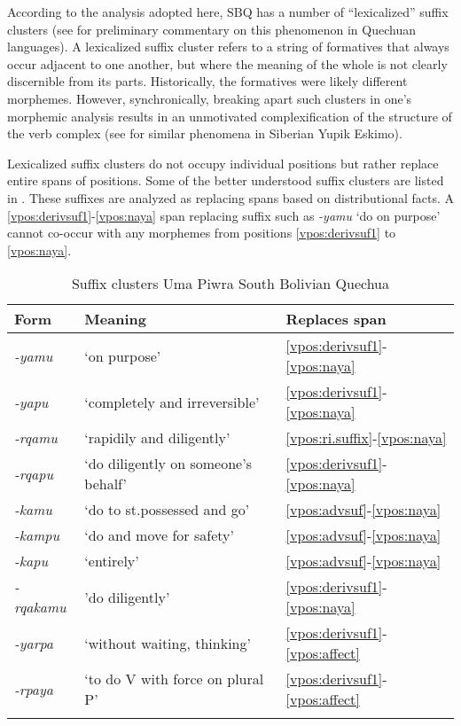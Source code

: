 \documentclass[output=paper]{langscibook}
\begin{document}
According to the analysis adopted here, SBQ has a number of ``lexicalized'' suffix clusters (see \citealt[208--209]{adelaar2004} for preliminary commentary on this phenomenon in Quechuan languages). A lexicalized suffix cluster refers to a string of formatives that always occur adjacent to one another, but where the meaning of the whole is not clearly discernible from its parts. Historically, the formatives were likely different morphemes. However, synchronically, breaking apart such clusters in one's morphemic analysis results in an unmotivated complexification of the structure of the verb complex (see \citealt{Reuse1994} for similar phenomena in Siberian Yupik Eskimo).

Lexicalized suffix clusters do not occupy individual positions but rather replace entire spans of positions. Some of the better understood suffix clusters are listed in . These suffixes are analyzed as replacing spans based on distributional facts. A \ref{vpos:derivsuf1}-\ref{vpos:naya} span replacing suffix such as \textit{-yamu} `do on purpose' cannot co-occur with any morphemes from positions \ref{vpos:derivsuf1} to \ref{vpos:naya}.

\begin{table}[htp]
\caption{Suffix clusters Uma Piwra South Bolivian Quechua}
\label{tab:suffixclusters}
\begin{tabular}{lll}
\lsptoprule
Form     & Meaning                             & Replaces span \\ \midrule
\textit{-yamu}    & `on purpose'                        & \ref{vpos:derivsuf1}-\ref{vpos:naya}         \\
\textit{-yapu}    & `completely and irreversible'       & \ref{vpos:derivsuf1}-\ref{vpos:naya}         \\
\textit{-rqamu}   & `rapidily and diligently'           & \ref{vpos:ri.suffix}-\ref{vpos:naya}         \\
\textit{-rqapu}   & `do diligently on someone's behalf' & \ref{vpos:derivsuf1}-\ref{vpos:naya}         \\
\textit{-kamu}   & `do to st.possessed and go'            & \ref{vpos:advsuf}-\ref{vpos:naya}         \\
\textit{-kampu}   & `do and move for safety'            & \ref{vpos:advsuf}-\ref{vpos:naya}         \\
\textit{-kapu}   & `entirely'            & \ref{vpos:advsuf}-\ref{vpos:naya}         \\
\textit{-rqakamu} & 'do diligently'                     & \ref{vpos:derivsuf1}-\ref{vpos:naya}         \\
\textit{-yarpa}   & `without waiting, thinking'         & \ref{vpos:derivsuf1}-\ref{vpos:affect}         \\
\textit{-rpaya}   & `to do V with force on plural P'    & \ref{vpos:derivsuf1}-\ref{vpos:affect}        \\
\lspbottomrule
\end{tabular}
\end{table}
\end{document}
